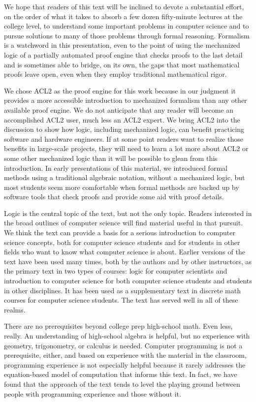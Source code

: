 We hope that readers of this text will be inclined
to devote a substantial effort, on the order
of what it takes to absorb a few dozen fifty-minute
lectures at the college level,
to understand some important problems in computer science and
to pursue solutions to many of those problems through formal reasoning.
Formalism is a watchword in this presentation, even to the
point of using the mechanized logic of a partially automated proof engine
that checks proofs to the last detail and is sometimes able
to bridge, on its own, the gaps that most mathematical
proofs leave open, even when they employ traditional
mathematical rigor.

We chose ACL2 as the proof engine for this work
because in our judgment it provides a more accessible
introduction to mechanized formalism than any other
available proof engine. We do not anticipate that any
reader will become an accomplished ACL2 user,
much less an ACL2 expert. We bring ACL2 into the discussion
to show how logic, including mechanized logic,
can benefit practicing software and hardware engineers.
If at some point readers want to realize those benefits in
large-scale projects, they will need to learn a lot more
about ACL2 or some other mechanized logic than it will
be possible to glean from this introduction.
In early presentations of this material,
we introduced formal methods using a traditional algebraic notation,
without a mechanized logic, but most students seem more comfortable
when formal methods are backed up by software tools
that check proofs and provide some aid with proof details.

Logic is the central topic of the text, but not the only topic.
Readers interested in the broad outlines of computer science
will find material useful in that pursuit.
We think the text can provide a basis for a serious introduction
to computer science concepts, both for computer science students
and for students in other fields who want to know
what computer science is about.
Earlier versions of the text have been used many times,
both by the authors and by other instructors,
as the primary text in two types of courses: logic for computer scientists
and introduction to computer science for both computer science students
and students in other disciplines. It has been used as a supplementary
text in discrete math courses for computer science students.
The text has served well in all of these realms.

There are no prerequisites beyond college prep high-school math.
Even less, really.
An understanding of high-school algebra is helpful,
but no experience with geometry, trigonometry, or calculus is needed.
Computer programming is not a prerequisite, either,
and based on experience with the material in the classroom,
programming experience is not especially helpful
because it rarely addresses the equation-based model of computation that
informs this text. In fact, we have found that the approach of the text
tends to level the playing ground between people with programming
experience and those without it.

